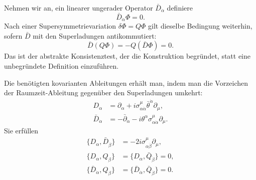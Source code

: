 Nehmen wir an, ein linearer ungerader Operator \(\bar D_{\dot\alpha}\) definiere
\begin{equation}
\bar D_{\dot\alpha}\Phi=0.
\label{eq:l8-chiral-constraint}
\end{equation}
Nach einer Supersymmetrievariation \(\delta\Phi=Q\Phi\) gilt dieselbe Bedingung weiterhin, sofern \(\bar D\) mit den Superladungen antikommutiert:
\begin{equation}
\bar D(Q\Phi)=-Q(\bar D\Phi)=0.
\end{equation}
Das ist der abstrakte Konsistenztest, der die Konstruktion begründet, statt eine unbegründete Definition einzuführen.

\begin{classroomqa}
\end{classroomqa}

Die benötigten kovarianten Ableitungen erhält man, indem man die Vorzeichen der Raumzeit-Ableitung gegenüber den Superladungen umkehrt:
\begin{align}
D_\alpha
&=\partial_\alpha
+i\sigma^\mu_{\alpha\dot\alpha}
\bar\theta^{\dot\alpha}\partial_\mu,
\label{eq:l8-D}\\
\bar D_{\dot\alpha}
&=-\bar\partial_{\dot\alpha}
-i\theta^\alpha\sigma^\mu_{\alpha\dot\alpha}\partial_\mu.
\label{eq:l8-Dbar}
\end{align}
Sie erfüllen
\begin{align}
\{D_\alpha,\bar D_{\dot\beta}\}
&=-2i\sigma^\mu_{\alpha\dot\beta}\partial_\mu,\\
\{D_\alpha,Q_\beta\}
&=\{D_\alpha,\bar Q_{\dot\beta}\}=0,\\
\{\bar D_{\dot\alpha},Q_\beta\}
&=\{\bar D_{\dot\alpha},\bar Q_{\dot\beta}\}=0.
\end{align}

\begin{classroomqa}
\end{classroomqa}


